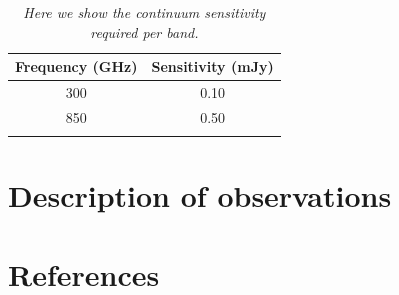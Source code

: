 \documentclass[12pt,a4paper]{article}  %
\begin{document}



\begin{table}[tbh]
\begin{center}
\caption[]{\em{Here we show the continuum sensitivity required per band.}}
\begin{tabular}{cc}
\hline \noalign {\smallskip}
Frequency (GHz) & Sensitivity (mJy) \\
\hline \noalign {\smallskip}
300 & 0.10 \\
850 & 0.50 \\
\hline \noalign {\smallskip}
\end{tabular}
\end{center}
\end{table}

\section{Description of observations}



\section*{References}




\end{document}
